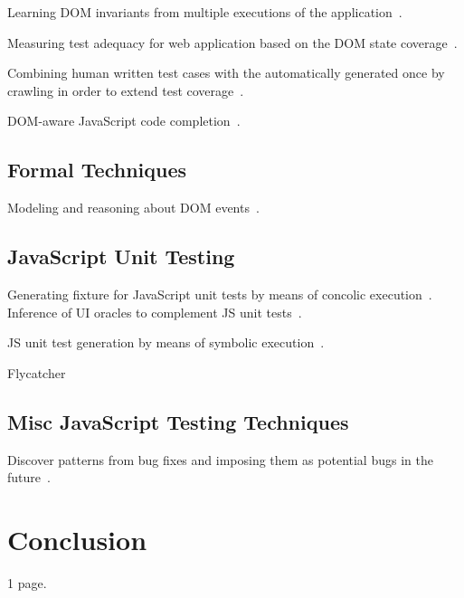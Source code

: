 \documentclass[sigconf]{acmart}
\begin{document}
Learning DOM invariants from multiple executions of the application~\cite{pattabiraman2010dodom}.

Measuring test adequacy for web application based on the DOM state coverage~\cite{mirzaaghaei2014dom}.

Combining human written test cases with the automatically generated once by crawling in order to extend test coverage~\cite{milani2014leveraging}.

DOM-aware JavaScript code completion~\cite{bajaj2014dompletion}. 

\subsection{Formal Techniques}
\label{sub.sec.formal}

Modeling and reasoning about DOM events~\cite{lerner2012modeling}.

\subsection{JavaScript Unit Testing}
\label{sub.sec.js.unit.test}

Generating fixture for JavaScript unit tests by means of concolic execution~\cite{amin:ase15}. Inference of UI oracles to complement JS unit tests~\cite{icst16}.

JS unit test generation by means of symbolic execution~\cite{tanida2014automatic}.

Flycatcher~\cite{deautomatic}

\subsection{Misc JavaScript Testing Techniques}
\label{sub.sec.misc.test.tech}

Discover patterns from bug fixes and imposing them as potential bugs in the future~\cite{quinn:fse16}. 

\section{Conclusion}
\label{sec:concl}
1 page.


 
\end{document}
